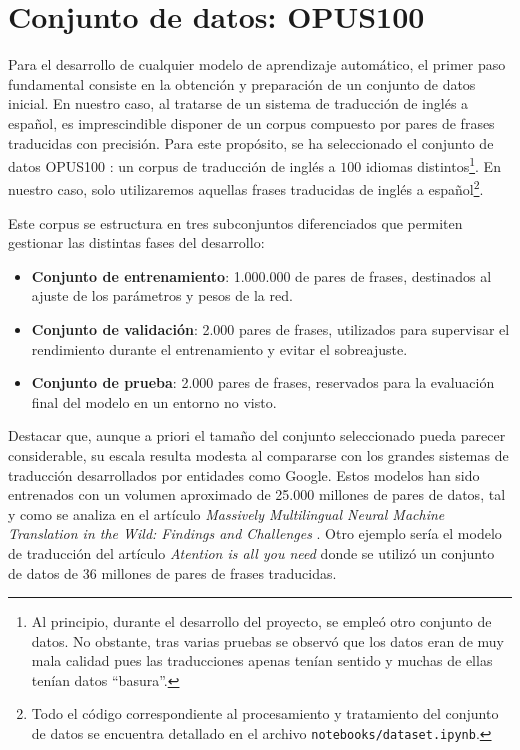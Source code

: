 \section{Conjunto de datos: OPUS100}

Para el desarrollo de cualquier modelo de aprendizaje automático, el primer paso fundamental consiste en la obtención y 
preparación de un conjunto de datos inicial. En nuestro caso, al tratarse de un sistema de traducción de inglés a español, 
es imprescindible disponer de un corpus compuesto por pares de frases traducidas con precisión. 
Para este propósito, se ha seleccionado el conjunto de datos OPUS100 \cite{TIEDEMANN12.463}: un corpus de 
traducción de inglés a $100$ idiomas distintos\footnote{Al principio, durante el desarrollo del proyecto, se empleó otro conjunto de datos. 
No obstante, tras varias pruebas se observó que los datos eran de muy mala calidad pues las traducciones apenas tenían sentido y 
muchas de ellas tenían datos ``basura''.}. En nuestro caso, solo utilizaremos aquellas frases traducidas de inglés a 
español\footnote{Todo el código correspondiente al procesamiento y tratamiento del conjunto de datos se encuentra detallado en el 
archivo \texttt{notebooks/dataset.ipynb}.}.

Este corpus se estructura en tres subconjuntos diferenciados que permiten gestionar las distintas fases del desarrollo:

\begin{itemize}
    \item \textbf{Conjunto de entrenamiento}: 1.000.000 de pares de frases, destinados al ajuste de los parámetros y pesos de la red.
    \item \textbf{Conjunto de validación}: 2.000 pares de frases, utilizados para supervisar el rendimiento durante el entrenamiento y 
    evitar el sobreajuste.
    \item \textbf{Conjunto de prueba}: 2.000 pares de frases, reservados para la evaluación final del modelo en un entorno no visto.
\end{itemize}

Destacar que, aunque a priori el tamaño del conjunto seleccionado pueda parecer considerable, su escala resulta modesta al compararse con 
los grandes sistemas de traducción desarrollados por entidades como Google. 
Estos modelos han sido entrenados con un volumen aproximado 
de 25.000 millones de pares de datos, tal y como se analiza en el artículo 
\textit{Massively Multilingual Neural Machine Translation in the Wild: Findings and Challenges} \cite{aharoni-etal-2019-massively}. 
Otro ejemplo sería el modelo de traducción del artículo \textit{Atention is all you need} \cite{vaswani2017attention_arxiv}
donde se utilizó un conjunto de datos de 36 millones de pares de frases traducidas. 

